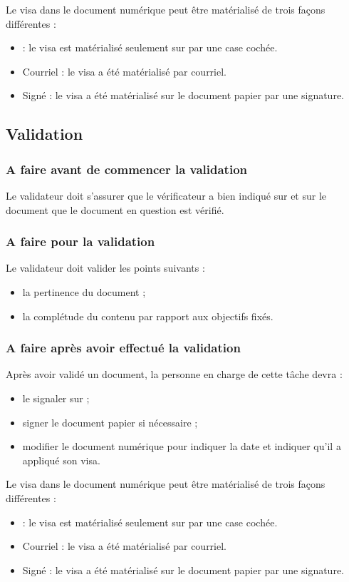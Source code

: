 Le visa dans le document numérique peut être matérialisé de trois façons différentes :
\begin{itemize}
\item \lintranet : le visa est matérialisé seulement sur \lintranet{} par une case cochée.
\item Courriel : le visa a été matérialisé par courriel.
\item Signé : le visa a été matérialisé sur le document papier par une signature.
\end{itemize}

\subsection{Validation}
\label{Validation}

\subsubsection*{A faire avant de commencer la validation}
Le validateur doit s'assurer que le vérificateur a bien indiqué sur \lintranet{} et sur le document que le document en question est vérifié.

\subsubsection*{A faire pour la validation}
Le validateur doit valider les points suivants :
\begin{itemize}
\item la pertinence du document ;
\item la complétude du contenu par rapport aux objectifs fixés.
\end{itemize}

\subsubsection*{A faire après avoir effectué la validation}
Après avoir validé un document, la personne en charge de cette tâche devra :
\begin{itemize}
\item le signaler sur \lintranet ;
\item signer le document papier si nécessaire ;
\item modifier le document numérique pour indiquer la date et indiquer qu'il a appliqué son
visa.
\end{itemize}

Le visa dans le document numérique peut être matérialisé de trois façons différentes :
\begin{itemize}
\item \lintranet : le visa est matérialisé seulement sur \lintranet{} par une case cochée.
\item Courriel : le visa a été matérialisé par courriel.
\item Signé : le visa a été matérialisé sur le document papier par une signature.
\end{itemize}


